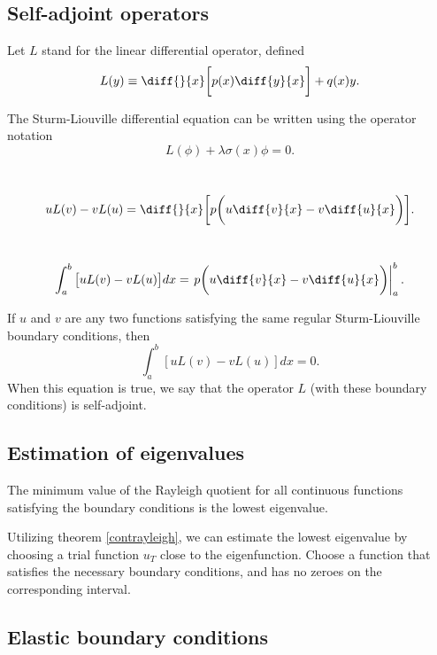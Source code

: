 \documentclass{article}
\begin{document}
\subsection{Self-adjoint operators}
\begin{definition}
	Let \(L\) stand for the linear differential operator, defined
	\begin{equation*}
		L(y)\equiv\diff{}{x}\bigg[p(x)\diff{y}{x}\bigg]+q(x)y.
	\end{equation*}
\end{definition}
\begin{proposition}
	The Sturm-Liouville differential equation can be written using the operator notation
	\begin{equation*}
		L(\phi)+\lambda\sigma(x)\phi=0.
	\end{equation*}
\end{proposition}
\begin{definition} 
	\,
	\begin{equation*}
		uL(v)-vL(u)=\diff{}{x}\bigg[p\bigg(u\diff{v}{x}-v\diff{u}{x}\bigg)\bigg].
	\end{equation*}
\end{definition}
\begin{definition}
	\,
	\begin{equation*}
		\int_a^b\big[uL(v)-vL(u)\big]dx=\Eval{p\bigg(u\diff{v}{x}-v\diff{u}{x}\bigg)}{a}{b}.
	\end{equation*}
\end{definition}
\begin{theorem}
	If \(u\) and \(v\) are any two functions satisfying the same regular Sturm-Liouville boundary conditions, then
	\begin{equation*}
		\int_a^b[uL(v)-vL(u)]dx=0.
	\end{equation*}
	When this equation is true, we say that the operator \(L\) (with these boundary conditions) is self-adjoint.
\end{theorem}
\subsection{Estimation of eigenvalues}
\begin{theorem}
	\label{contrayleigh}
	The minimum value of the Rayleigh quotient for all continuous functions satisfying the boundary conditions is the lowest eigenvalue.
\end{theorem}
\begin{proposition}
\noindent Utilizing theorem \ref{contrayleigh}, we can estimate the lowest eigenvalue by choosing a trial function \(u_T\) close to the eigenfunction. Choose a function that satisfies the necessary boundary conditions, and has no zeroes on the corresponding interval.
\end{proposition}
\subsection{Elastic boundary conditions}
\end{document}

